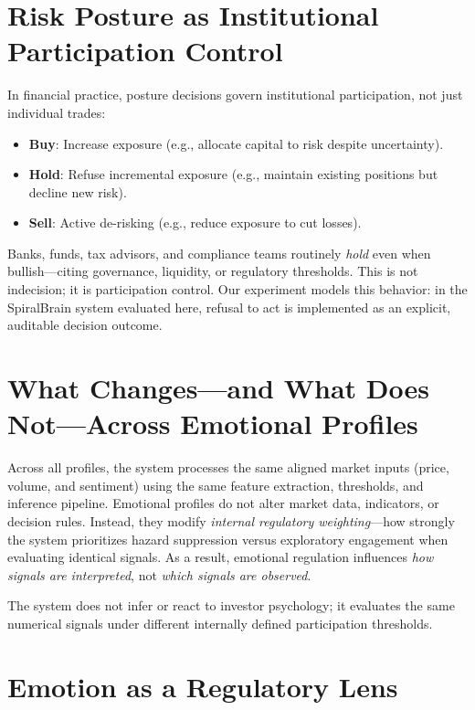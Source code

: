\documentclass[12pt,a4paper]{report}
\begin{document}
\section{Risk Posture as Institutional Participation Control}

In financial practice, posture decisions govern institutional participation, not just individual trades:

\begin{itemize}
	\item \textbf{Buy}: Increase exposure (e.g., allocate capital to risk despite uncertainty).
	\item \textbf{Hold}: Refuse incremental exposure (e.g., maintain existing positions but decline new risk).
	\item \textbf{Sell}: Active de-risking (e.g., reduce exposure to cut losses).
\end{itemize}

Banks, funds, tax advisors, and compliance teams routinely \emph{hold} even when bullish—citing governance, liquidity, or regulatory thresholds. This is not indecision; it is participation control. Our experiment models this behavior: in the SpiralBrain system evaluated here, refusal to act is implemented as an explicit, auditable decision outcome.

\section{What Changes—and What Does Not—Across Emotional Profiles}

Across all profiles, the system processes the same aligned market inputs (price, volume, and sentiment) using the same feature extraction, thresholds, and inference pipeline. Emotional profiles do not alter market data, indicators, or decision rules. Instead, they modify \emph{internal regulatory weighting}—how strongly the system prioritizes hazard suppression versus exploratory engagement when evaluating identical signals. As a result, emotional regulation influences \emph{how signals are interpreted}, not \emph{which signals are observed}.

The system does not infer or react to investor psychology; it evaluates the same numerical signals under different internally defined participation thresholds.

\section{Emotion as a Regulatory Lens}
\end{document}
